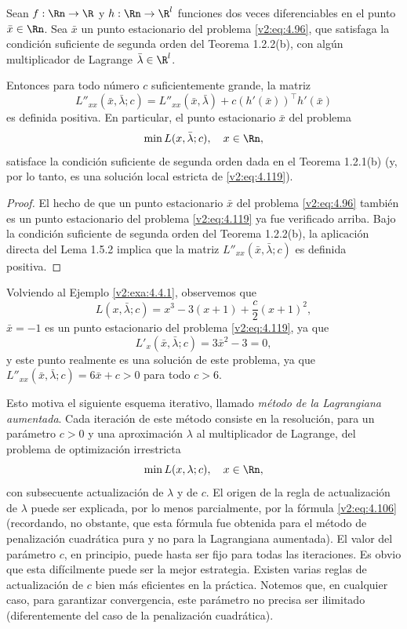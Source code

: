 \begin{theorem}\label{v2:thm:4.4.5}
    Sean $f: \Rn \to \R$ y $h: \Rn \to \R^l$ funciones dos veces diferenciables en el punto $\bar{x} \in \Rn$. Sea $\bar{x}$ un punto estacionario del problema \eqref{v2:eq:4.96}, que satisfaga la condición suficiente de segunda orden del Teorema 1.2.2(b), con algún multiplicador de Lagrange $\bar{\lambda} \in \R^l$.
    
    Entonces para todo número $c$ suficientemente grande, la matriz
    \[
        L''_{xx}(\bar{x}, \bar{\lambda}; c) = L''_{xx}(\bar{x}, \bar{\lambda}) + c(h'(\bar{x}))^\top h'(\bar{x})
    \]
    es definida positiva. En particular, el punto estacionario $\bar{x}$ del problema
    \begin{equation}
        \min L(x, \bar{\lambda}; c), \quad x \in \Rn,
        \label{v2:eq:4.119}
    \end{equation}
    satisface la condición suficiente de segunda orden dada en el Teorema 1.2.1(b) (y, por lo tanto, es una solución local estricta de \eqref{v2:eq:4.119}).
\end{theorem}

\begin{proof}
    El hecho de que un punto estacionario $\bar{x}$ del problema \eqref{v2:eq:4.96} también es un punto estacionario del problema \eqref{v2:eq:4.119} ya fue verificado arriba. Bajo la condición suficiente de segunda orden del Teorema 1.2.2(b), la aplicación directa del Lema 1.5.2 implica que la matriz $L''_{xx}(\bar{x}, \bar{\lambda}; c)$ es definida positiva.
\end{proof}

Volviendo al Ejemplo \ref{v2:exa:4.4.1}, observemos que
\[
    L(x, \bar{\lambda}; c) = x^3 - 3(x+1) + \frac{c}{2}(x+1)^2,
\]
$\bar{x} = -1$ es un punto estacionario del problema \eqref{v2:eq:4.119}, ya que
\[
    L'_x(\bar{x}, \bar{\lambda}; c) = 3\bar{x}^2 - 3 = 0,
\]
y este punto realmente es una solución de este problema, ya que $L''_{xx}(\bar{x}, \bar{\lambda}; c) = 6\bar{x} + c > 0$ para todo $c > 6$.

Esto motiva el siguiente esquema iterativo, llamado \textit{método de la Lagrangiana aumentada}. Cada iteración de este método consiste en la resolución, para un parámetro $c > 0$ y una aproximación $\lambda$ al multiplicador de Lagrange, del problema de optimización irrestricta
\begin{equation}
    \min L(x, \lambda; c), \quad x \in \Rn,
    \label{v2:eq:4.120}
\end{equation}
con subsecuente actualización de $\lambda$ y de $c$. El origen de la regla de actualización de $\lambda$ puede ser explicada, por lo menos parcialmente, por la fórmula \eqref{v2:eq:4.106} (recordando, no obstante, que esta fórmula fue obtenida para el método de penalización cuadrática pura y no para la Lagrangiana aumentada). El valor del parámetro $c$, en principio, puede hasta ser fijo para todas las iteraciones. Es obvio que esta difícilmente puede ser la mejor estrategia. Existen varias reglas de actualización de $c$ bien más eficientes en la práctica. Notemos que, en cualquier caso, para garantizar convergencia, este parámetro no precisa ser ilimitado (diferentemente del caso de la penalización cuadrática).

